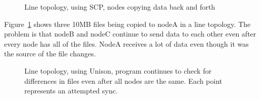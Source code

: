 \documentclass[12pt]{article}
\begin{document}
\begin{figure}[htp]
    \caption{Line topology, using SCP, nodes copying data back and forth}
    \label{fig:line_scp_back_forth_graph}
\end{figure}

Figure~\ref{fig:line_scp_back_forth_graph} shows three 10MB files being copied to nodeA
in a line topology. The problem is that nodeB and nodeC continue to send
data to each other even after every node has all of the files. NodeA receives
a lot of data even though it was the source of the file changes. 

\begin{figure}[htp]
    \caption{Line topology, using Unison, program continues to check
    for differences in files even after all nodes are the same.
    Each point represents an attempted sync.}
    \label{fig:line_uni_tail_graph}
\end{figure}
\end{document}
